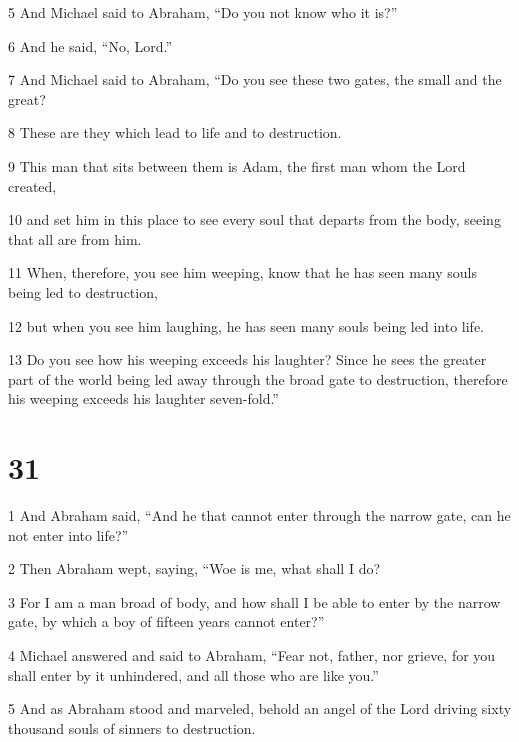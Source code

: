 \par 5 And Michael said to Abraham, “Do you not know who it is?” 

\par 6 And he said, “No, Lord.” 

\par 7 And Michael said to Abraham, “Do you see these two gates, the small and the great? 

\par 8 These are they which lead to life and to destruction. 

\par 9 This man that sits between them is Adam, the first man whom the Lord created, 

\par 10 and set him in this place to see every soul that departs from the body, seeing that all are from him. 

\par 11 When, therefore, you see him weeping, know that he has seen many souls being led to destruction, 

\par 12 but when you see him laughing, he has seen many souls being led into life. 

\par 13 Do you see how his weeping exceeds his laughter? Since he sees the greater part of the world being led away through the broad gate to destruction, therefore his weeping exceeds his laughter seven-fold.”

\chapter{31}

\par 1 And Abraham said, “And he that cannot enter through the narrow gate, can he not enter into life?” 

\par 2 Then Abraham wept, saying, “Woe is me, what shall I do? 

\par 3 For I am a man broad of body, and how shall I be able to enter by the narrow gate, by which a boy of fifteen years cannot enter?” 

\par 4 Michael answered and said to Abraham, “Fear not, father, nor grieve, for you shall enter by it unhindered, and all those who are like you.” 

\par 5 And as Abraham stood and marveled, behold an angel of the Lord driving sixty thousand souls of sinners to destruction. 

